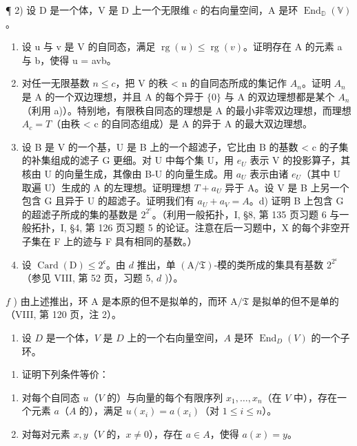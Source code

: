 ¶ 2) 设 D 是一个体，V 是 D 上一个无限维 c 的右向量空间，A 是环 \(\operatorname{End}_{\mathbb{D}}(\mathbb{V})\)。

\begin{enumerate}
\def\labelenumi{\alph{enumi})}
\item
  设 u 与 v 是 V 的自同态，满足 \(\operatorname{rg}(u) \leqslant \operatorname{rg}(v)\)。证明存在 A 的元素 a 与 b，使得 u = avb。
\item
  对任一无限基数 \(n \leqslant c\)，把 V 的秩 \textless{} n 的自同态所成的集记作 \(A_{n}\)。证明 \(A_{n}\) 是 A 的一个双边理想，并且 A 的每个异于 \(\{0\}\) 与 A 的双边理想都是某个 \(A_{n}\)（利用 a)）。特别地，有限秩自同态的理想是 A 的最小非零双边理想，而理想 \(A_{c} = T\)（由秩 \textless{} c 的自同态组成）是 A 的异于 A 的最大双边理想。
\item
  设 B 是 V 的一个基，U 是 B 上的一个超滤子，它比由 B 的基数 \textless{} c 的子集的补集组成的滤子 G 更细。对 U 中每个集 U，用 \(e_{U}\) 表示 V 的投影算子，其核由 U 的向量生成，其像由 B-U 的向量生成。用 \(a_{U}\) 表示由诸 \(e_{U}\)（其中 U 取遍 U）生成的 A 的左理想。证明理想 \(T + a_{U}\) 异于 A。设 V 是 B 上另一个包含 G 且异于 U 的超滤子。证明我们有 \(a_{U} + a_{V} = A\)。d) 证明 B 上包含 G 的超滤子所成的集的基数是 \(2^{2^{c}}\)。（利用一般拓扑，I, §8, 第 135 页习题 6 与一般拓扑，I, §4, 第 126 页习题 5 的论证。注意在后一习题中，X 的每个非空开子集在 F 上的迹与 F 具有相同的基数。）
\item
  设 \(\operatorname{Card}(\mathrm{D}) \leqslant 2^{\mathfrak{c}}\)。由 \(d\) 推出，单 \((\mathrm{A} / \mathfrak{T})\)-模的类所成的集具有基数 \(2^{2^{\mathfrak{c}}}\)（参见 VIII, 第 52 页，习题 5, \(d\) )）。
\end{enumerate}

\(f\) ) 由上述推出，环 A 是本原的但不是拟单的，而环 \(\mathrm{A} / \mathfrak{T}\) 是拟单的但不是单的（VIII, 第 120 页，注 2）。

\begin{enumerate}
\def\labelenumi{\arabic{enumi})}
\setcounter{enumi}{2}
\tightlist
\item
  设 \(D\) 是一个体，\(V\) 是 \(D\) 上的一个右向量空间，\(A\) 是环 \(\operatorname{End}_D(V)\) 的一个子环。
\end{enumerate}

\begin{enumerate}
\def\labelenumi{\alph{enumi})}
\tightlist
\item
  证明下列条件等价：
\end{enumerate}

\begin{enumerate}
\def\labelenumi{(\roman{enumi})}
\item
  对每个自同态 \(u\)（\(V\) 的）与向量的每个有限序列 \(x_{1},\ldots ,x_{n}\)（在 \(V\) 中），存在一个元素 \(a\)（\(A\) 的），满足 \(u(x_{i}) = a(x_{i})\)（对 \(1\leqslant i\leqslant n\)）。
\item
  对每对元素 \(x, y\)（\(V\) 的，\(x \neq 0\)），存在 \(a \in A\)，使得 \(a(x) = y\)。
\end{enumerate}

